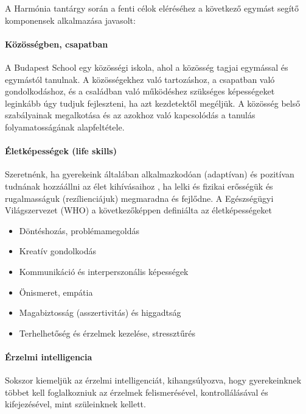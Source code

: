 A Harmónia tantárgy során a fenti célok eléréséhez a következő egymást segítő komponensek alkalmazása javasolt:

\paragraph{Közösségben, csapatban}

A Budapest School egy közösségi iskola, ahol a közösség tagjai egymással és egymástól tanulnak. A közösségekhez való tartozáshoz, a csapatban való gondolkodáshoz, és a családban való működéshez szükséges képességeket leginkább úgy tudjuk fejleszteni, ha azt kezdetektől megéljük. A közösség belső szabályainak megalkotása és az azokhoz való kapcsolódás a tanulás folyamatosságának alapfeltétele.

\paragraph{Életképességek (life skills)}

Szeretnénk, ha gyerekeink általában alkalmazkodóan (adaptívan) és pozitívan tudnának hozzáállni az élet kihívásaihoz , ha lelki és fizikai erősségük és rugalmasságuk (rezílienciájuk) megmaradna és fejlődne.   A Egészségügyi Világszervezet (WHO) a következőképpen definiálta\cite{oecd99lifeskills} az életképességeket
\begin{itemize}
\item Döntéshozás, problémamegoldás

\item Kreatív gondolkodás

\item Kommunikáció és interperszonális képességek

\item Önismeret, empátia

\item Magabiztosság (asszertivitás) és higgadtság

\item Terhelhetőség és érzelmek kezelése, stressztűrés
\end{itemize}
\paragraph{Érzelmi intelligencia}

Sokszor kiemeljük az érzelmi intelligenciát, kihangsúlyozva, hogy gyerekeinknek többet kell foglalkozniuk az érzelmek felismerésével, kontrollálásával és kifejezésével, mint szüleinknek kellett.

